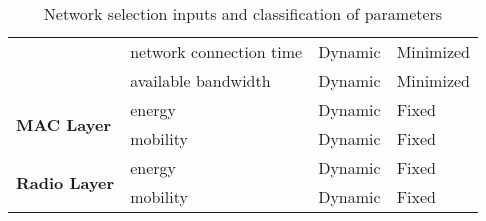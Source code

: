 \begin{table}[h!]
\begin{tabular}{l|l|l|l}
	\                                                  & network connection time & Dynamic       & Minimized  \\
	\                                                  & available bandwidth     & Dynamic       & Minimized  \\\hline
	\multirow{2}{*}{\textbf{MAC Layer}} 	           & energy                  & Dynamic       & Fixed      \\
	\                                                  & mobility                & Dynamic       & Fixed      \\\hline	
	\multirow{2}{*}{\textbf{Radio Layer}} 	           & energy                  & Dynamic       & Fixed      \\
	\                                                  & mobility                & Dynamic       & Fixed      \\\hline
	\end{tabular}
	\caption{\label{tab:network_selection} Network selection inputs and classification of parameters \cite{bendaoud_network_2019}}
\end{table}

